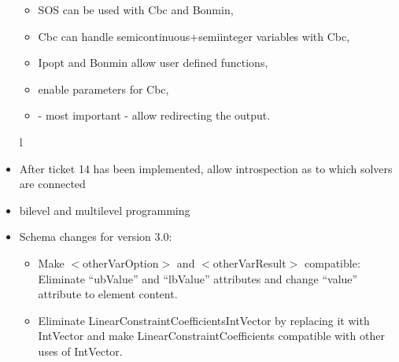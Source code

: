 \begin{itemize}
\begin{itemize}
\item SOS can be used with Cbc and Bonmin,
\item Cbc can handle semicontinuous+semiinteger variables with Cbc, 
\item Ipopt and Bonmin allow user defined functions,
\item enable parameters for Cbc, 
\item - most important - allow redirecting the output.
\end{itemize}

%
%
%
l%
%
%
%
\item After ticket 14 has been implemented, allow introspection as to which solvers are connected 

\item bilevel and multilevel programming

\item Schema changes for version 3.0:

\begin{itemize}
\item Make $<$otherVarOption$>$ and $<$otherVarResult$>$ compatible: Eliminate ``ubValue'' and ``lbValue'' attributes and change ``value'' attribute to element content.

\item Eliminate LinearConstraintCoefficientsIntVector by replacing it with IntVector and make LinearConstraintCoefficients compatible with other uses of IntVector.

\end{itemize}

\end{itemize}

\fi
